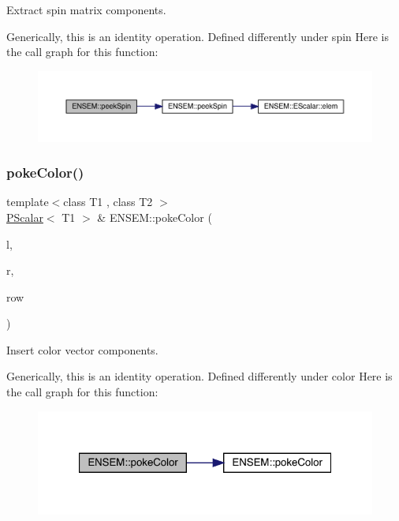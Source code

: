 Extract spin matrix components. 

Generically, this is an identity operation. Defined differently under spin Here is the call graph for this function\+:\nopagebreak
\begin{figure}[H]
\begin{center}
\leavevmode
\includegraphics[width=350pt]{db/dcc/group__primscalar_gae6a011ab6458165e95b6e647d6684b7b_cgraph}
\end{center}
\end{figure}
\mbox{\label{group__primscalar_ga7e556b2cf2409e6342b4591b4d4fb83f}} 
\subsubsection{\texorpdfstring{pokeColor()}{pokeColor()}\hspace{0.1cm}{\footnotesize\ttfamily [1/2]}}
{\footnotesize\ttfamily template$<$class T1 , class T2 $>$ \\
\mbox{\hyperlink{classENSEM_1_1PScalar}{P\+Scalar}}$<$ T1 $>$ \& E\+N\+S\+E\+M\+::poke\+Color (\begin{DoxyParamCaption}\item[{\mbox{\hyperlink{classENSEM_1_1PScalar}{P\+Scalar}}$<$ T1 $>$ \&}]{l,  }\item[{const \mbox{\hyperlink{classENSEM_1_1PScalar}{P\+Scalar}}$<$ T2 $>$ \&}]{r,  }\item[{int}]{row }\end{DoxyParamCaption})\hspace{0.3cm}{\ttfamily [inline]}}



Insert color vector components. 

Generically, this is an identity operation. Defined differently under color Here is the call graph for this function\+:\nopagebreak
\begin{figure}[H]
\begin{center}
\leavevmode
\includegraphics[width=321pt]{db/dcc/group__primscalar_ga7e556b2cf2409e6342b4591b4d4fb83f_cgraph}
\end{center}
\end{figure}
\mbox{\label{group__primscalar_ga540606e7a9a4e2fbb97da4a95bc1c21f}} 
